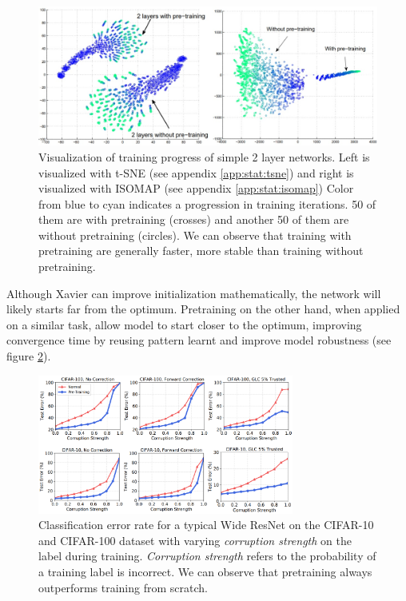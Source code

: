 \begin{figure}
    \centering
    \includegraphics[width=1\textwidth]{images/introduction/pretrain_vis.jpg}
    \caption{Visualization of training progress of simple 2 layer networks. Left is visualized with t-SNE (see appendix \ref{app:stat:tsne}) and right is visualized with ISOMAP (see appendix \ref{app:stat:isomap}) Color from blue to cyan indicates a progression in training iterations. 50 of them are with pretraining (crosses) and another 50 of them are without pretraining (circles). We can observe that training with pretraining are generally faster, more stable than training without pretraining.\cite{erhanWhyDoesUnsupervised}} 
    \label{fig:pretrain_tsne}
\end{figure}

Although Xavier can improve initialization mathematically, the network will likely starts far from the optimum. Pretraining on the other hand, when applied on a similar task, allow model to start closer to the optimum, improving convergence time by reusing pattern learnt and improve model robustness\cite{hendrycksUsingPreTrainingCan2019} (see figure \ref{fig:pretrain_robustness}).


\begin{figure}
    \centering
    \includegraphics[width=0.75\textwidth]{images/introduction/pretrain_robustness.png}
    \caption{Classification error rate for a typical Wide ResNet\cite{zagoruykoWideResidualNetworks2017} on the CIFAR-10 and CIFAR-100 dataset with varying \textit{corruption strength} on the label during training. \textit{Corruption strength} refers to the probability of a training label is incorrect. We can observe that pretraining always outperforms training from scratch.} 
    \label{fig:pretrain_robustness}
\end{figure}

